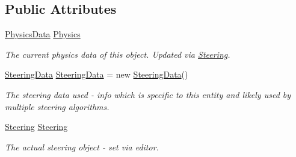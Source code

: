 \subsection*{Public Attributes}
\begin{DoxyCompactItemize}
\item 
\hyperlink{class_skyrates_1_1_common_1_1_a_i_1_1_physics_data}{Physics\-Data} \hyperlink{class_skyrates_1_1_common_1_1_entity_1_1_entity_dynamic_a2cc825f563606d4d565a4b0de1feab19}{Physics}
\begin{DoxyCompactList}\small\item\em The current physics data of this object. Updated via \hyperlink{class_skyrates_1_1_common_1_1_entity_1_1_entity_dynamic_a8d35984946a298623b4de895873de43b}{Steering}. \end{DoxyCompactList}\item 
\hyperlink{class_skyrates_1_1_common_1_1_a_i_1_1_steering_data}{Steering\-Data} \hyperlink{class_skyrates_1_1_common_1_1_entity_1_1_entity_dynamic_a60e4edbed3f02c3ba4a7c6150fbad90e}{Steering\-Data} = new \hyperlink{class_skyrates_1_1_common_1_1_a_i_1_1_steering_data}{Steering\-Data}()
\begin{DoxyCompactList}\small\item\em The steering data used -\/ info which is specific to this entity and likely used by multiple steering algorithms. \end{DoxyCompactList}\item 
\hyperlink{class_skyrates_1_1_common_1_1_a_i_1_1_steering}{Steering} \hyperlink{class_skyrates_1_1_common_1_1_entity_1_1_entity_dynamic_a8d35984946a298623b4de895873de43b}{Steering}
\begin{DoxyCompactList}\small\item\em The actual steering object -\/ set via editor. \end{DoxyCompactList}\end{DoxyCompactItemize}
